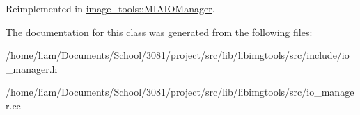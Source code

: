 Reimplemented in \hyperlink{classimage__tools_1_1MIAIOManager_a209180ddcfe3bf43d8fd7c6635391ea4}{image\+\_\+tools\+::\+M\+I\+A\+I\+O\+Manager}.



The documentation for this class was generated from the following files\+:\begin{DoxyCompactItemize}
\item 
/home/liam/\+Documents/\+School/3081/project/src/lib/libimgtools/src/include/io\+\_\+manager.\+h\item 
/home/liam/\+Documents/\+School/3081/project/src/lib/libimgtools/src/io\+\_\+manager.\+cc\end{DoxyCompactItemize}

